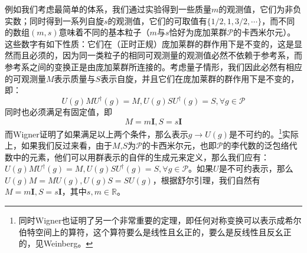 例如我们考虑最简单的体系，我们通过实验得到一些质量$m$的观测值，它们为非负实数；同时得到一系列自旋$s$的观测值，它们的可取值有$\{1/2,1,3/2,\cdots\}$，而不同的数组$(m,s)$意味着不同的基本粒子（$m$与$s$恰好为庞加莱群$\mathcal{P}$的卡西米尔元）。这些数字有如下性质：它们在（正时正规）庞加莱群的群作用下是不变的，这是显然而且必须的，因为同一类粒子的相同可观测量的观测值必然不依赖于参考系，而参考系之间的变换正是由庞加莱群所连接的。考虑量子情形，我们因此必然有相应的可观测量$M$表示质量与$S$表示自旋，并且它们在庞加莱群的群作用下是不变的，即：
\begin{equation}
	U(g)MU^\dagger(g)=M,U(g)SU^\dagger(g)=S,\forall g\in \mathcal{P}
\end{equation}
同时也必须满足有固定值，即
\begin{equation}
	M=m\boldsymbol{I},S=s\boldsymbol{I}
\end{equation}
而Wigner证明了如果满足以上两个条件，那么表示$g\to U(g)$是不可约的。\footnote{同时Wigner也证明了另一个非常重要的定理，即任何对称变换可以表示成希尔伯特空间上的算符，这个算符要么是线性且幺正的，要么是反线性且反幺正的，见Weinberg。}实际上，如果我们反过来看，由于$M$,$S$为$\mathcal{P}$的卡西米尔元，也即$\mathcal{P}$的李代数的泛包络代数中的元素，他们可以用群表示的自伴的生成元来定义，那么我们应有：$U(g)MU^\dagger(g)=M,U(g)SU^\dagger(g)=S,\forall g\in \mathcal{P}$。如果$U$是不可约表示，那么$U(g)M=MU(g),U(g)S=SU(g)$，根据舒尔引理，我们自然有$M=m\boldsymbol{I},S=s\boldsymbol{I}$，其中$s,m\in \mathbb{R}$。

